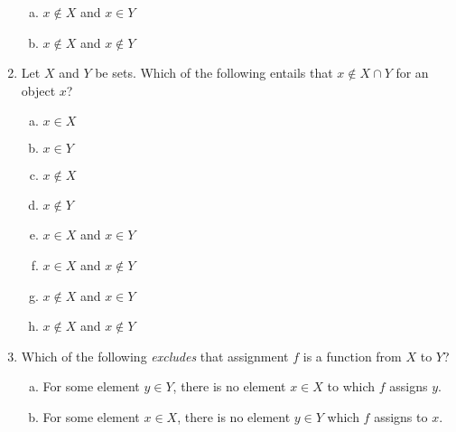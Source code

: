 \begin{enumerate}[\thesection.1]
\begin{minipage}{.5\linewidth}
\begin{enumerate}[(a)]
			\item $x\notin X$ and $x\in Y$
			
			\item $x\notin X$ and $x\notin Y$			
					
		\end{enumerate}
		\end{minipage}
		
		\item Let $X$ and $Y$ be sets. Which of the following entails that $x\notin X\cap Y$ for an object $x$?
		
		\begin{minipage}{.5\linewidth}
			\begin{enumerate}[(a)]
		
			\item $x\in X$
			
			\item $x\in Y$			
			
			\item $x\notin X$
			
			\item $x\notin Y$
		\end{enumerate}
		\end{minipage}
		\begin{minipage}{.5\linewidth}
		\begin{enumerate}[(a)]
		\setcounter{enumii}{4}
			
			\item $x\in X$ and $x\in Y$
		
			\item $x\in X$ and $x\notin Y$
			
			\item $x\notin X$ and $x\in Y$
			
			\item $x\notin X$ and $x\notin Y$			
					
		\end{enumerate}
		\end{minipage}
		
      \item Which of the following \emph{excludes} that assignment $f$ is a function from $X$ to $Y$?

        \begin{enumerate}[(a)]

          \item For some element $y\in Y$, there is no element $x\in X$ to which $f$ assigns $y$.

          \item For some element $x\in X$, there is no element $y\in Y$ which $f$ assigns to $x$.


\end{enumerate}
\end{enumerate}
